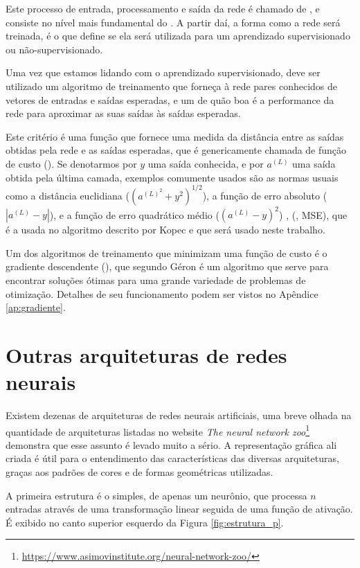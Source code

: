 Este processo de entrada, processamento e saída da rede é chamado de , e consiste no nível mais fundamental do . A partir daí, a forma como a rede será treinada, é o que define se ela será utilizada para um aprendizado supervisionado ou não-supervisionado.

Uma vez que estamos lidando com o aprendizado supervisionado, deve ser utilizado um algoritmo de treinamento que forneça à rede pares conhecidos de vetores de entradas e saídas esperadas, e um  de quão boa é a performance da rede para aproximar as suas saídas às saídas esperadas.

Este critério é uma função que fornece uma medida da distância entre as saídas obtidas pela rede e as saídas esperadas, que é genericamente chamada de função de custo (). Se denotarmos por $y$ uma saída conhecida, e por $a^{(L)}$ uma saída obtida pela última camada, exemplos comumente usados são as normas usuais como a distância euclidiana ($(a^{(L)^2} + y^2)^{1/2}$), a função de erro absoluto ($|a^{(L)} - y|$), e a função de erro quadrático médio ($(a^{(L)} - y)^2$) , (, MSE), que é a usada no algoritmo descrito por Kopec \citep{classic} e que será usado neste trabalho.

Um dos algoritmos de treinamento que minimizam uma função de custo é o gradiente descendente (), que segundo Géron \citep{hands} é um algoritmo que serve para encontrar soluções ótimas para uma grande variedade de problemas de otimização. Detalhes de seu funcionamento podem ser vistos no Apêndice \ref{ap:gradiente}.

\section{Outras arquiteturas de redes neurais}

Existem dezenas de arquiteturas de redes neurais artificiais, uma breve olhada na quantidade de arquiteturas listadas no website \emph{The neural network zoo}\footnote{\url{https://www.asimovinstitute.org/neural-network-zoo/}} demonstra que esse assunto é levado muito a sério. A representação gráfica ali criada é útil para o entendimento das características das diversas arquiteturas, graças aos padrões de cores e de formas geométricas utilizadas.

A primeira estrutura é o  simples, de apenas um neurônio, que processa $n$ entradas através de uma transformação linear seguida de uma função de ativação. É exibido no canto superior esquerdo da Figura \ref{fig:estrutura_p}.

